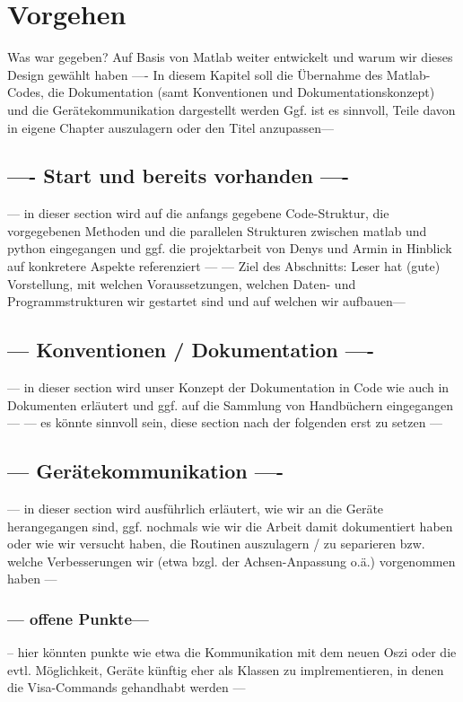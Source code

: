 \documentclass[../Report.tex]{subfiles}
\begin{document}
\chapter{Vorgehen}
\label{chap:vorgehen}
Was war gegeben? Auf Basis von Matlab weiter entwickelt und warum wir dieses Design gewählt haben
---- In diesem Kapitel soll die Übernahme des Matlab-Codes, die Dokumentation (samt Konventionen und Dokumentationskonzept) und die Gerätekommunikation dargestellt werden 
Ggf. ist es sinnvoll, Teile davon in eigene Chapter auszulagern oder den Titel anzupassen--- 

\section[---setup ---]{---- Start und bereits vorhanden  ----}
\label{sec:vorg.setup}
--- in dieser section wird auf die anfangs gegebene Code-Struktur, die vorgegebenen Methoden und die parallelen Strukturen zwischen matlab und python eingegangen und ggf. die projektarbeit von Denys und Armin in Hinblick auf konkretere Aspekte referenziert ---
--- Ziel des Abschnitts: Leser hat (gute) Vorstellung, mit welchen Voraussetzungen, welchen Daten- und Programmstrukturen wir gestartet sind und auf welchen wir aufbauen---


\section{ --- Konventionen / Dokumentation ---- }
\label{sec:vorg.doku}
--- in dieser section wird unser Konzept der Dokumentation in Code wie auch in Dokumenten erläutert und ggf. auf die Sammlung von Handbüchern eingegangen --- 
--- es könnte sinnvoll sein, diese section nach der folgenden erst zu setzen --- 

\section{ --- Gerätekommunikation ---- }
\label{sec:vorg.geraete}
--- in dieser section wird ausführlich erläutert, wie wir an die Geräte herangegangen sind, ggf. nochmals wie wir die Arbeit damit dokumentiert haben oder wie wir versucht haben, die Routinen auszulagern / zu separieren bzw. welche Verbesserungen wir (etwa bzgl. der Achsen-Anpassung o.ä.) vorgenommen haben   --- 
\\

\subsection{--- offene Punkte---}
\label{subsec:vorg.geraete.open}
-- hier könnten punkte wie etwa die Kommunikation mit dem neuen Oszi oder die evtl. Möglichkeit, Geräte künftig eher als Klassen zu implrementieren, in denen die Visa-Commands gehandhabt werden --- 
\end{document}
